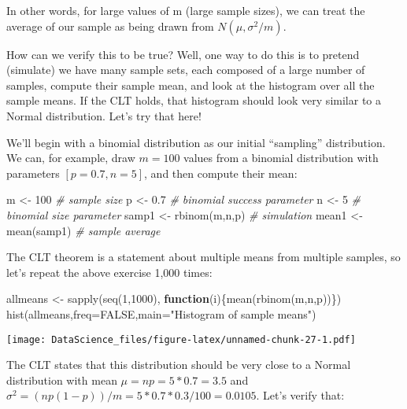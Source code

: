 \documentclass[
]{book}
\newenvironment{Shaded}{\begin{snugshade}}{\end{snugshade}}
\newcommand{\AttributeTok}[1]{\textcolor[rgb]{0.77,0.63,0.00}{#1}}
\newcommand{\CommentTok}[1]{\textcolor[rgb]{0.56,0.35,0.01}{\textit{#1}}}
\newcommand{\ConstantTok}[1]{\textcolor[rgb]{0.00,0.00,0.00}{#1}}
\newcommand{\ControlFlowTok}[1]{\textcolor[rgb]{0.13,0.29,0.53}{\textbf{#1}}}
\newcommand{\DecValTok}[1]{\textcolor[rgb]{0.00,0.00,0.81}{#1}}
\newcommand{\FloatTok}[1]{\textcolor[rgb]{0.00,0.00,0.81}{#1}}
\newcommand{\FunctionTok}[1]{\textcolor[rgb]{0.00,0.00,0.00}{#1}}
\newcommand{\NormalTok}[1]{#1}
\newcommand{\OtherTok}[1]{\textcolor[rgb]{0.56,0.35,0.01}{#1}}
\newcommand{\StringTok}[1]{\textcolor[rgb]{0.31,0.60,0.02}{#1}}
\begin{document}
In other words, for large values of m (large sample sizes), we can treat the average of our sample as being drawn from \(N(\mu,\sigma^2/m)\).

How can we verify this to be true? Well, one way to do this is to pretend (simulate) we have many sample sets, each composed of a large number of samples, compute their sample mean, and look at the histogram over all the sample means. If the CLT holds, that histogram should look very similar to a Normal distribution. Let's try that here!

We'll begin with a binomial distribution as our initial ``sampling'' distribution. We can, for example, draw \(m=100\) values from a binomial distribution with parameters \([p=0.7,n=5]\), and then compute their mean:

\begin{Shaded}
\begin{Highlighting}[]
\NormalTok{m }\OtherTok{\textless{}{-}} \DecValTok{100} \CommentTok{\# sample size}
\NormalTok{p }\OtherTok{\textless{}{-}} \FloatTok{0.7} \CommentTok{\# binomial success parameter}
\NormalTok{n }\OtherTok{\textless{}{-}} \DecValTok{5} \CommentTok{\# binomial size parameter}
\NormalTok{samp1 }\OtherTok{\textless{}{-}} \FunctionTok{rbinom}\NormalTok{(m,n,p)  }\CommentTok{\# simulation}
\NormalTok{mean1 }\OtherTok{\textless{}{-}} \FunctionTok{mean}\NormalTok{(samp1) }\CommentTok{\# sample average}
\end{Highlighting}
\end{Shaded}

The CLT theorem is a statement about multiple means from multiple samples, so let's repeat the above exercise 1,000 times:

\begin{Shaded}
\begin{Highlighting}[]
\NormalTok{allmeans }\OtherTok{\textless{}{-}} \FunctionTok{sapply}\NormalTok{(}\FunctionTok{seq}\NormalTok{(}\DecValTok{1}\NormalTok{,}\DecValTok{1000}\NormalTok{), }\ControlFlowTok{function}\NormalTok{(i)\{}\FunctionTok{mean}\NormalTok{(}\FunctionTok{rbinom}\NormalTok{(m,n,p))\})}
\FunctionTok{hist}\NormalTok{(allmeans,}\AttributeTok{freq=}\ConstantTok{FALSE}\NormalTok{,}\AttributeTok{main=}\StringTok{"Histogram of sample means"}\NormalTok{)}
\end{Highlighting}
\end{Shaded}

\texttt{[image: DataScience\_files/figure-latex/unnamed-chunk-27-1.pdf]}

The CLT states that this distribution should be very close to a Normal distribution with mean \(\mu = np = 5*0.7 = 3.5\) and \(\sigma^2 = (np(1-p))/m = 5*0.7*0.3/100 = 0.0105\). Let's verify that:
\end{document}
